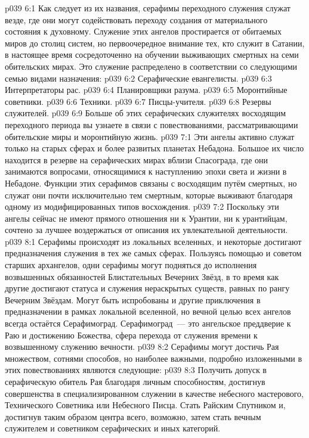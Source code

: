 \vs p039 6:1 Как следует из их названия, серафимы переходного служения служат везде, где они могут содействовать переходу создания от материального состояния к духовному. Служение этих ангелов простирается от обитаемых миров до столиц систем, но первоочередное внимание тех, кто служит в Сатании, в настоящее время сосредоточенно на обучении выживающих смертных на семи обительских мирах. Это служение распределено в соответствии со следующими семью видами назначения:
\vs p039 6:2 Серафические евангелисты.
\vs p039 6:3 Интерпретаторы рас.
\vs p039 6:4 Планировщики разума.
\vs p039 6:5 Моронтийные советники.
\vs p039 6:6 Техники.
\vs p039 6:7 Писцы\hyp{}учителя.
\vs p039 6:8 Резервы служителей.
\vs p039 6:9 \pc Больше об этих серафических служителях восходящим переходного периода вы узнаете в связи с повествованиями, рассматривающими обительские миры и моронтийную жизнь.
\vs p039 7:1 Эти ангелы активно служат только на старых сферах и более развитых планетах Небадона. Большое их число находится в резерве на серафических мирах вблизи Спасограда, где они занимаются вопросами, относящимися к наступлению эпохи света и жизни в Небадоне. Функции этих серафимов связаны с восходящим путём смертных, но служат они почти исключительно тем смертным, которые выживают благодаря одному из модифицированных типов восхождения.
\vs p039 7:2 Поскольку эти ангелы сейчас не имеют прямого отношения ни к Урантии, ни к урантийцам, сочтено за лучшее воздержаться от описания их увлекательной деятельности.
\vs p039 8:1 Серафимы происходят из локальных вселенных, и некоторые достигают предназначения служения в тех же самых сферах. Пользуясь помощью и советом старших архангелов, одни серафимы могут подняться до исполнения возвышенных обязанностей Блистательных Вечерних Звёзд, в то время как другие достигают статуса и служения нераскрытых существ, равных по рангу Вечерним Звёздам. Могут быть испробованы и другие приключения в предназначении в рамках локальной вселенной, но вечной целью всех ангелов всегда остаётся Серафимоград. Серафимоград~--- это ангельское преддверие к Раю и достижению Божества, сфера перехода от служения времени к возвышенному служению вечности.
\vs p039 8:2 \pc Серафимы могут достичь Рая множеством, сотнями способов, но наиболее важными, подробно изложенными в этих повествованиях являются следующие:
\vs p039 8:3 Получить допуск в серафическую обитель Рая благодаря личным способностям, достигнув совершенства в специализированном служении в качестве небесного мастерового, Технического Советника или Небесного Писца. Стать Райским Спутником и, достигнув таким образом центра всего, возможно, затем стать вечным служителем и советником серафических и иных категорий.
